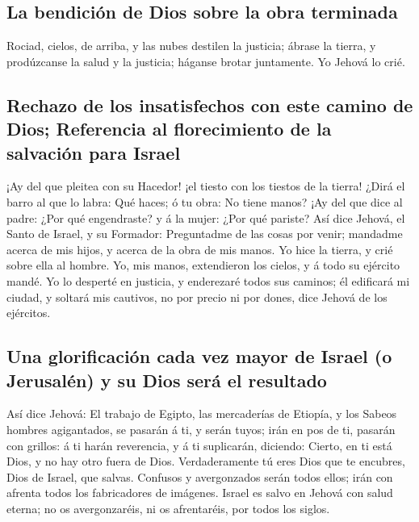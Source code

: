 \hypertarget{la-bendiciuxf3n-de-dios-sobre-la-obra-terminada}{%
\subsection{La bendición de Dios sobre la obra
terminada}\label{la-bendiciuxf3n-de-dios-sobre-la-obra-terminada}}

 Rociad, cielos, de arriba, y las nubes destilen la
justicia; ábrase la tierra, y prodúzcanse la salud y la justicia;
háganse brotar juntamente. Yo Jehová lo crié.

\hypertarget{rechazo-de-los-insatisfechos-con-este-camino-de-dios-referencia-al-florecimiento-de-la-salvaciuxf3n-para-israel}{%
\subsection{Rechazo de los insatisfechos con este camino de Dios;
Referencia al florecimiento de la salvación para
Israel}\label{rechazo-de-los-insatisfechos-con-este-camino-de-dios-referencia-al-florecimiento-de-la-salvaciuxf3n-para-israel}}

 ¡Ay del que pleitea con su Hacedor! ¡el tiesto con los
tiestos de la tierra! ¿Dirá el barro al que lo labra: Qué haces; ó tu
obra: No tiene manos?  ¡Ay del que dice al padre: ¿Por qué
engendraste? y á la mujer: ¿Por qué pariste?  Así dice
Jehová, el Santo de Israel, y su Formador: Preguntadme de las cosas por
venir; mandadme acerca de mis hijos, y acerca de la obra de mis manos.
 Yo hice la tierra, y crié sobre ella al hombre. Yo, mis
manos, extendieron los cielos, y á todo su ejército mandé. 
Yo lo desperté en justicia, y enderezaré todos sus caminos; él edificará
mi ciudad, y soltará mis cautivos, no por precio ni por dones, dice
Jehová de los ejércitos.

\hypertarget{una-glorificaciuxf3n-cada-vez-mayor-de-israel-o-jerusaluxe9n-y-su-dios-seruxe1-el-resultado}{%
\subsection{Una glorificación cada vez mayor de Israel (o Jerusalén) y
su Dios será el
resultado}\label{una-glorificaciuxf3n-cada-vez-mayor-de-israel-o-jerusaluxe9n-y-su-dios-seruxe1-el-resultado}}

 Así dice Jehová: El trabajo de Egipto, las mercaderías de
Etiopía, y los Sabeos hombres agigantados, se pasarán á ti, y serán
tuyos; irán en pos de ti, pasarán con grillos: á ti harán reverencia, y
á ti suplicarán, diciendo: Cierto, en ti está Dios, y no hay otro fuera
de Dios.  Verdaderamente tú eres Dios que te encubres, Dios
de Israel, que salvas.  Confusos y avergonzados serán todos
ellos; irán con afrenta todos los fabricadores de imágenes.
 Israel es salvo en Jehová con salud eterna; no os
avergonzaréis, ni os afrentaréis, por todos los siglos.

